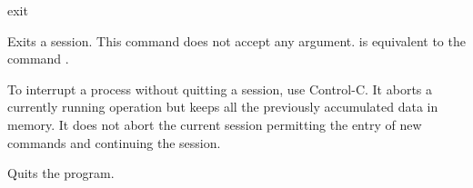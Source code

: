  
\begin{command}{exit}{} 

	\syntax{\obligatory{()}}

	\begin{poydescription}
         Exits a \poy session. This command does not accept any argument.
          is equivalent to the command .

 \begin{statement}
	To interrupt a process without quitting a \poy session, use Control-C.
         It aborts a currently running operation but keeps all the previously accumulated
         data in memory. It does not abort the current session permitting the entry of new
         commands and continuing the session.
        \end{statement}
	
	 \end{poydescription}
	 
    \begin{poyexamples}
            {Quits the program.}
    \end{poyexamples}

    \begin{poyalso}
    \end{poyalso}

\end{command}

 
